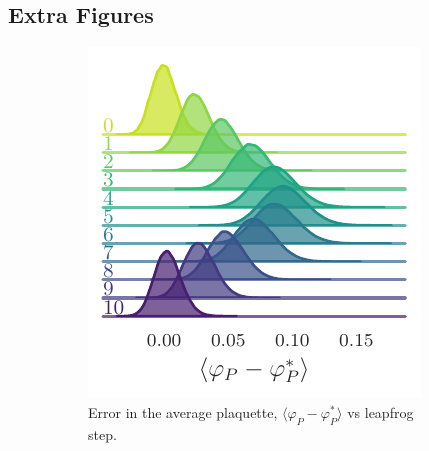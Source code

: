 \documentclass{article} %
\begin{document}
\subsection{\label{subsec:extra_figures}Extra Figures}
\begin{figure}[htpb]
   \centering
   \begin{subfigure}{0.31\textwidth}
      \includegraphics[width=\textwidth]{figures/2021-03-09/plaqsf_1758.pdf}
      \caption{\label{fig:plaqsf}Error in the average plaquette, \(\langle\varphi_{P}-\varphi_{P}^{*}\rangle\) vs
      leapfrog step.}
   \end{subfigure}
   \hfill
   \begin{subfigure}{0.31\textwidth}

\end{subfigure}
\end{figure}
\end{document}
